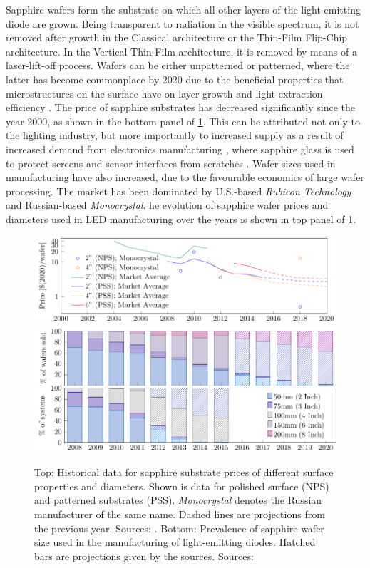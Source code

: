 \documentclass[10pt]{article}
\begin{document}
Sapphire wafers form the substrate on which all other layers of the light-emitting diode are grown. Being transparent to radiation in the visible spectrum, it is not removed after growth in the Classical architecture or the Thin-Film Flip-Chip architecture. In the Vertical Thin-Film architecture, it is removed by means of a laser-lift-off process. Wafers can be either unpatterned or patterned, where the latter has become commonplace by 2020 due to the beneficial properties that microstructures on the surface have on layer growth \cite{wuu2009defect} and light-extraction efficiency \cite{lee2006enhancing}. The price of sapphire substrates has decreased significantly since the year 2000, as shown in the bottom panel of \cref{fig:wafers}. This can be attributed not only to the lighting industry, but more importantly to increased supply as a result of increased demand from electronics manufacturing \cite{yole2015sapphire}, where sapphire glass is used to protect screens and sensor interfaces from scratches \cite{khattak2016world}. Wafer sizes used in manufacturing have also increased, due to the favourable economics of large wafer processing. The market has been dominated by U.S.-based \textit{Rubicon Technology} and Russian-based \textit{Monocrystal}. he evolution of sapphire wafer prices and diameters used in LED manufacturing over the years is shown in top panel of \cref{fig:wafers}.

\begin{figure}[h!]
    \includegraphics[width=15cm]{./figures/sapphire_prices.pdf}
    \includegraphics[width=14.5cm]{./figures/wafer_size.pdf}
	\caption{Top: Historical data for sapphire substrate prices of different surface properties and diameters. Shown is data for polished surface (NPS) and patterned substrates (PSS). \textit{Monocrystal} denotes the Russian manufacturer of the same name. Dashed lines are projections from the previous year. Sources: \cite{monocrystal2020private}\cite{yole2011sapphire}\cite{yole2015sapphire}. Bottom: Prevalence of sapphire wafer size used in the manufacturing of light-emitting diodes. Hatched bars are projections given by the sources. Sources: \cite{veeco2013}\cite{Scholand2012}\cite{yole2015sapphire}}
	\label{fig:wafers}
\end{figure}
\end{document}

